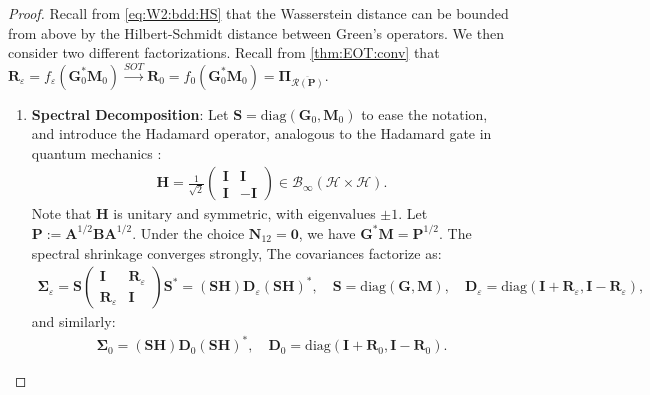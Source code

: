 \documentclass[noinfoline]{imsart}\setcounter{tocdepth}{2}
\newcommand{\m}[1]{\mathbf{#1}}
\renewcommand{\c}[1]{\mathcal{#1}}
\theoremstyle{plain}
\begin{document}
\begin{proof}
Recall from \eqref{eq:W2:bdd:HS} that the Wasserstein distance can be bounded from above by the Hilbert-Schmidt distance between Green's operators. We then consider two different factorizations. Recall from \cref{thm:EOT:conv} that $\m{R}_{\varepsilon} = f_{\varepsilon}(\m{G}_{0}^{*} \m{M}_{0}) \xrightarrow{SOT} \m{R}_{0} = f_{0}(\m{G}_{0}^{*} \m{M}_{0}) = \m{\Pi}_{\overline{\c{R}(\m{P})}}$.

\begin{enumerate}[leftmargin = *]
\item \textbf{Spectral Decomposition}: Let $\m{S} = \text{diag}(\m{G}_{0}, \m{M}_{0})$ to ease the notation, and introduce the Hadamard operator, analogous to the Hadamard gate in quantum mechanics \cite{hall2013quantum}:
\begin{align*}
    \m{H} = \frac{1}{\sqrt{2}} \left(
    \begin{array}{c|c}
    \m{I} & \m{I} \\
    \hline
    \m{I} & - \m{I}
    \end{array}
    \right) \in \c{B}_{\infty}(\c{H} \times \c{H}).
\end{align*}
Note that $\m{H}$ is unitary and symmetric, with eigenvalues $\pm 1$. Let $\m{P} := \m{A}^{1/2} \m{B} \m{A}^{1/2}$. Under the choice $\m{N}_{12}=\m{0}$, we have $\m{G}^*\m{M} = \m{P}^{1/2}$. The spectral shrinkage converges strongly, 
The covariances factorize as:
\begin{align*}
    \m{\Sigma}_{\varepsilon} = \m{S} \left(
    \begin{array}{c|c}
    \m{I} & \m{R}_{\varepsilon} \\
    \hline
    \m{R}_{\varepsilon} & \m{I}
    \end{array}
    \right) \m{S}^* = (\m{S} \m{H}) \m{D}_{\varepsilon} (\m{S} \m{H})^{*}, \quad \m{S} = \text{diag}(\m{G}, \m{M}), \quad \m{D}_{\varepsilon} = \text{diag}(\m{I} + \m{R}_{\varepsilon}, \m{I} - \m{R}_{\varepsilon}),
\end{align*}
and similarly:
\begin{align*}
    \m{\Sigma}_{0} = (\m{S} \m{H}) \m{D}_{0} (\m{S} \m{H})^{*}, \quad \m{D}_{0} = \text{diag}(\m{I} + \m{R}_{0}, \m{I} - \m{R}_{0}).
\end{align*}


\end{enumerate}
\end{proof}
\end{document}
